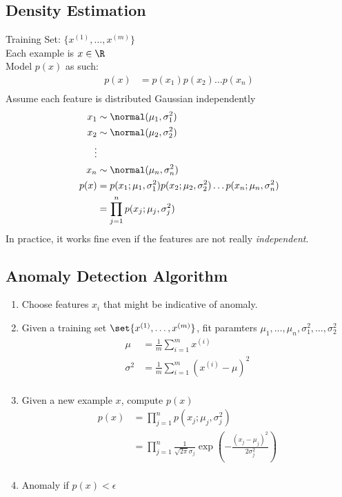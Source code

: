 \subsection{Density Estimation}
Training Set: $\{x^{(1)}, \dots, x^{(m)}\}$\\
Each example is $x \in \R$\\
Model $p(x)$ as such:
\begin{align*}
    p(x) & = p(x_1)p(x_2)\dots p(x_n) \\
\end{align*}
Assume each feature is distributed Gaussian independently
\begin{align*}
    x_1  & \sim \normal(\mu_1, \sigma^2_1)                                                  \\
    x_2  & \sim \normal(\mu_2, \sigma^2_2)                                                  \\
    \vdots                                                                                  \\
    x_n  & \sim \normal(\mu_n, \sigma^2_n)                                                  \\
    p(x) & = p(x_1;\mu_1, \sigma^2_1)p(x_2;\mu_2, \sigma^2_2)\dots p(x_n;\mu_n, \sigma^2_n) \\
         & = \prod_{j=1}^n p(x_j; \mu_j, \sigma^2_j)                                        \\
\end{align*}
In practice, it works fine even if the features are not really \emph{independent}.

\subsection{Anomaly Detection Algorithm}
\begin{enumerate}
    \item Choose features $x_i$ that might be indicative of anomaly.
    \item Given a training set $\set{x^{(1)}, \dots, x^{(m)}}$, fit paramters
          $\mu_1, \dots, \mu_n, \sigma^2_1, \dots, \sigma^2_2$
          \begin{align*}
              \mu      & = \frac{1}{m}\sum_{i=1}^m x^{(i)}          \\
              \sigma^2 & = \frac{1}{m}\sum_{i=1}^m(x^{(i)} - \mu)^2 \\
          \end{align*}
    \item Given a new example $x$, compute $p(x)$
          \begin{align*}
              p(x) & = \prod_{j=1}^n p(x_j; \mu_j, \sigma^2_j)     \\
                   & = \prod_{j=1}^n \frac{1}{\sqrt{2\pi}\sigma_j}
              \exp\left(-\frac{(x_j-\mu_j)^2}{2\sigma_j^2}\right)  \\
          \end{align*}
    \item Anomaly if $p(x) < \epsilon$
\end{enumerate}

